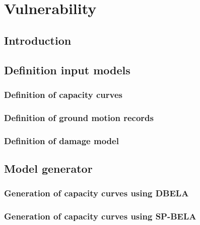 \chapter{Vulnerability}
\label{chap:vulnerability}

    \section{Introduction}
    

    \section{Definition input models}
    
    
		\subsection{Definition of capacity curves}
		\label{subsec:cap_curves}
		
		
		\subsection{Definition of ground motion records}
		\label{subsec:gmrs}
		
		
		\subsection{Definition of damage model}
		\label{subsec:dmg_model}
		

	\section{Model generator}
	\label{sec:model-gen}
	
		
		\subsection{Generation of capacity curves using DBELA}
		\label{subsec:DBELA}
		
		
		\subsection{Generation of capacity curves using SP-BELA}
		\label{subsec:SPBELA}
		
		
